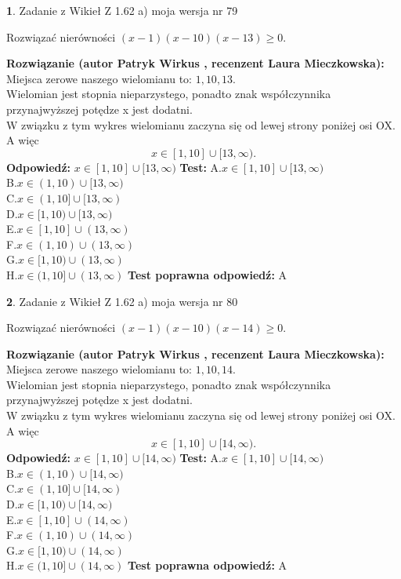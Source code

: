 \documentclass[12pt, a4paper]{article}
\theoremstyle{definition} %
\newtheorem{zad}{}
\newcommand{\zadStart}[1]{\begin{zad}#1\newline}
\newcommand{\zadStop}{\end{zad}}
\newcommand{\rozwStart}[2]{\noindent \textbf{Rozwiązanie (autor #1 , recenzent #2): }\newline}
\newcommand{\rozwStop}{\newline}
\newcommand{\odpStart}{\noindent \textbf{Odpowiedź:}\newline}
\newcommand{\odpStop}{\newline}
\newcommand{\testStart}{\noindent \textbf{Test:}\newline}
\newcommand{\testStop}{\newline}
\newcommand{\kluczStart}{\noindent \textbf{Test poprawna odpowiedź:}\newline}
\newcommand{\kluczStop}{\newline}
\begin{document}
\zadStart{Zadanie z Wikieł Z 1.62 a) moja wersja nr 79}

Rozwiązać nierówności $(x-1)(x-10)(x-13)\ge0$.
\zadStop
\rozwStart{Patryk Wirkus}{Laura Mieczkowska}
Miejsca zerowe naszego wielomianu to: $1, 10, 13$.\\
Wielomian jest stopnia nieparzystego, ponadto znak współczynnika przy\linebreak najwyższej potędze x jest dodatni.\\ W związku z tym wykres wielomianu zaczyna się od lewej strony poniżej osi OX. A więc $$x \in [1,10] \cup [13,\infty).$$
\rozwStop
\odpStart
$x \in [1,10] \cup [13,\infty)$
\odpStop
\testStart
A.$x \in [1,10] \cup [13,\infty)$\\
B.$x \in (1,10) \cup [13,\infty)$\\
C.$x \in (1,10] \cup [13,\infty)$\\
D.$x \in [1,10) \cup [13,\infty)$\\
E.$x \in [1,10] \cup (13,\infty)$\\
F.$x \in (1,10) \cup (13,\infty)$\\
G.$x \in [1,10) \cup (13,\infty)$\\
H.$x \in (1,10] \cup (13,\infty)$
\testStop
\kluczStart
A
\kluczStop



\zadStart{Zadanie z Wikieł Z 1.62 a) moja wersja nr 80}

Rozwiązać nierówności $(x-1)(x-10)(x-14)\ge0$.
\zadStop
\rozwStart{Patryk Wirkus}{Laura Mieczkowska}
Miejsca zerowe naszego wielomianu to: $1, 10, 14$.\\
Wielomian jest stopnia nieparzystego, ponadto znak współczynnika przy\linebreak najwyższej potędze x jest dodatni.\\ W związku z tym wykres wielomianu zaczyna się od lewej strony poniżej osi OX. A więc $$x \in [1,10] \cup [14,\infty).$$
\rozwStop
\odpStart
$x \in [1,10] \cup [14,\infty)$
\odpStop
\testStart
A.$x \in [1,10] \cup [14,\infty)$\\
B.$x \in (1,10) \cup [14,\infty)$\\
C.$x \in (1,10] \cup [14,\infty)$\\
D.$x \in [1,10) \cup [14,\infty)$\\
E.$x \in [1,10] \cup (14,\infty)$\\
F.$x \in (1,10) \cup (14,\infty)$\\
G.$x \in [1,10) \cup (14,\infty)$\\
H.$x \in (1,10] \cup (14,\infty)$
\testStop
\kluczStart
A
\kluczStop
\end{document}
